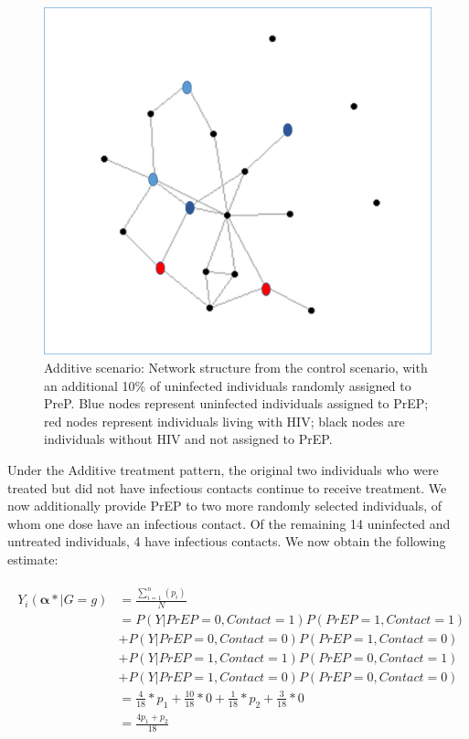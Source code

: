 \documentclass{article}
\theoremstyle{definition}
\begin{document}
\begin{figure}[H]
    \centering
    \includegraphics[scale=0.5]{Original Figures/Network Example 4.png}
    \caption{Additive scenario: Network structure from the control scenario, with an additional 10\%  of uninfected individuals randomly assigned to PreP. Blue nodes represent uninfected individuals assigned to PrEP; red nodes represent individuals living with HIV; black nodes are individuals without HIV and not assigned to PrEP.}
    \label{fig: Figure 4}
\end{figure}

Under the Additive treatment pattern, the original two individuals who were treated but did not have infectious contacts continue to receive treatment. We now additionally provide PrEP to two more randomly selected individuals, of whom one dose have an infectious contact. Of the remaining 14 uninfected and untreated individuals, 4 have infectious contacts. We now obtain the following estimate: 

\begin{align}\label{eq:13}
\begin{split}
Y_{i}\left(\mathbf{\alpha*}|G=g\right) & = \frac{\sum_{i=1}^{n}(p_{i})}{N}  \\ 
& = P\left(Y|PrEP = 0, Contact = 1\right)P\left(PrEP = 1, Contact = 1\right)  \\ \nonumber
& +P\left(Y|PrEP = 0, Contact = 0\right)P\left(PrEP = 1, Contact = 0\right)  \\ \nonumber
& +P\left(Y|PrEP = 1, Contact = 1\right)P\left(PrEP = 0, Contact = 1\right) \\ \nonumber
&  +P\left(Y|PrEP = 1, Contact = 0\right)P\left(PrEP = 0, Contact = 0\right)\\ \nonumber
 &= \frac{4}{18}*p_1 +  \frac{10}{18}*0 +\frac{1}{18}*p_2 +  \frac{3}{18}*0\\ \nonumber
 &=\frac{4p_1+p_2}{18}  \nonumber
 \end{split}
\end{align}
\end{document}
